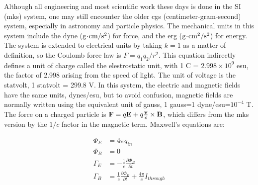 Although all engineering and most scientific work these days is done in the SI (mks) system, one may still encounter the
older cgs (centimeter-gram-second) system, especially in astronomy and particle physics. The mechanical units
in this system include the dyne ($\textup{g}\!\cdot\!\textup{cm}/\textup{s}^2$) for force, and the
erg ($\textup{g}\!\cdot\!\textup{cm}^2/\textup{s}^2$) for energy. The system is extended to electrical units by taking
$k=1$ as a matter of definition, so the Coulomb force law is $F=q_1q_2/r^2$. This equation indirectly defines a unit of
charge called the elestrostatic unit, with 1 C = $2.998\times10^9$ esu, the factor of 2.998 arising from the speed of
light. The unit of voltage is the statvolt, 1 statvolt = 299.8 V. In this system, the electric and magnetic fields
have the same units, dynes/esu, but to avoid confusion, magnetic fields are normally written using the equivalent
unit of gauss, 1 gauss=1 dyne/esu=$10^{-4}$ T. The force on a charged particle is $\mathbf{F}=q\mathbf{E}+q\frac{\mathbf{v}}{c}\times\mathbf{B}$,
which differs from the mks version by the $1/c$ factor in the magnetic term.
Maxwell's equations are:

	\begin{align*}
		\Phi_E		&= 4\pi q_{in} \\
		\Phi_B		&= 0 \\
		\Gamma_E 	&= -\frac{1}{c} \frac{\partial\Phi_B}{\partial t} \\
		\Gamma_B 	&= \frac{1}{c} \frac{\partial\Phi_E}{\partial t}  + \frac{4\pi}{c} I_{through}
	\end{align*}
